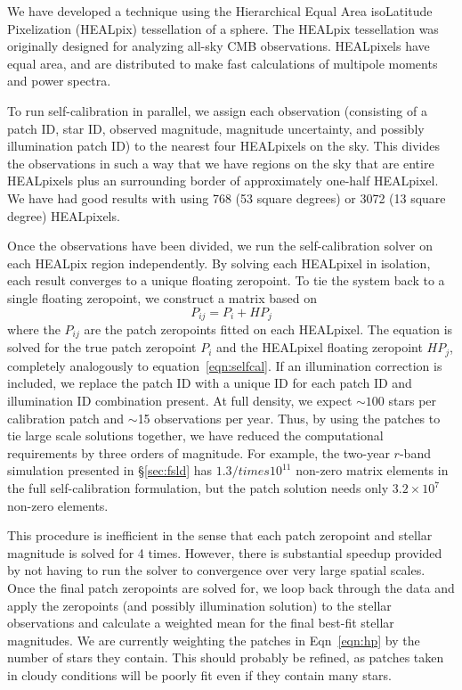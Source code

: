 \documentclass[12pt,preprint]{aastex}
\begin{document}
We have developed a technique using the Hierarchical Equal Area isoLatitude Pixelization (HEALpix) tessellation of a sphere.  The HEALpix tessellation was originally designed for analyzing all-sky CMB observations.  HEALpixels have equal area, and are distributed to make fast calculations of multipole moments and power spectra.  

To run self-calibration in parallel, we assign each observation (consisting of a patch ID, star ID, observed magnitude, magnitude uncertainty, and possibly illumination patch ID) to the nearest four HEALpixels on the sky.  This divides the observations in such a way that we have regions on the sky that are entire HEALpixels plus an surrounding border of approximately one-half HEALpixel.  We have had good results with using 768 (53 square degrees) or 3072 (13 square degree) HEALpixels.  

Once the observations have been divided, we run the self-calibration solver on each HEALpix region independently.  By solving each HEALpixel in isolation, each result converges to a unique floating zeropoint.  To tie the system back to a single floating zeropoint, we construct a matrix based on
\begin{equation}\label{eqn:hp}
P_{ij} = P_{i} + HP_{j}
\end{equation}
where the $P_{ij}$ are the patch zeropoints fitted on each HEALpixel.  The equation is solved for the true patch zeropoint $P_{i}$ and the HEALpixel floating zeropoint $HP_{j}$, completely analogously to equation~\ref{eqn:selfcal}.  If an illumination correction is included, we replace the patch ID with a unique ID for each patch ID and illumination ID combination present.  At full density, we expect $\sim100$ stars per calibration patch and $\sim$15 observations per year.  Thus, by using the patches to tie large scale solutions together, we have reduced the computational requirements by three orders of magnitude.  For example, the two-year $r$-band simulation presented in \S\ref{sec:fsld} has $1.3/times 10^11$  non-zero matrix elements in the full self-calibration formulation, but the patch solution needs only $3.2 \times 10^7$ non-zero elements.  

This procedure is inefficient in the sense that each patch zeropoint and stellar magnitude is solved for 4 times.  However, there is substantial speedup provided by not having to run the solver to convergence over very large spatial scales.  Once the final patch zeropoints are solved for, we loop back through the data and apply the zeropoints (and possibly illumination solution) to the stellar observations and calculate a weighted mean for the final best-fit stellar magnitudes.  We are currently weighting the patches in Eqn~\ref{eqn:hp} by the number of stars they contain.  This should probably be refined, as patches taken in cloudy conditions will be poorly fit even if they contain many stars.  
\end{document}
